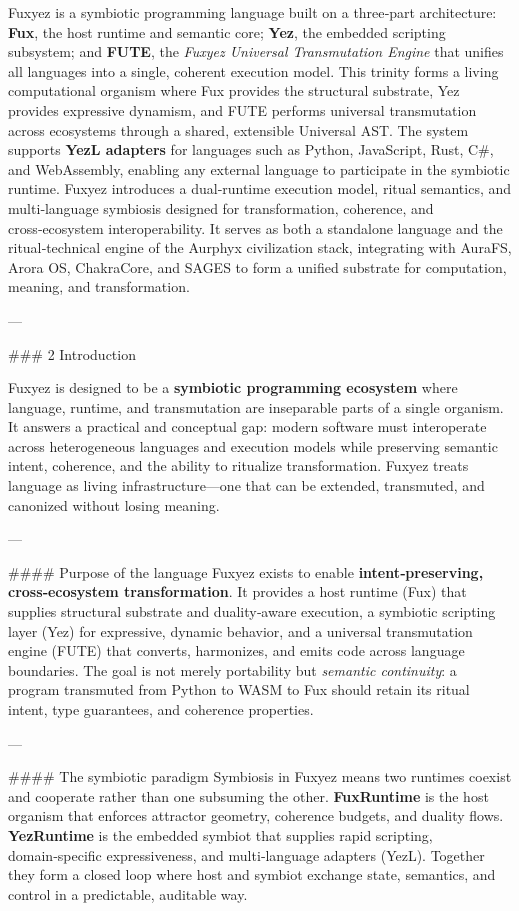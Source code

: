 \documentclass[12pt, a4paper]{book}
\begin{document}
Fuxyez is a symbiotic programming language built on a three‑part architecture: \textbf{Fux}, the host runtime and semantic core; \textbf{Yez}, the embedded scripting subsystem; and \textbf{FUTE}, the \textit{Fuxyez Universal Transmutation Engine} that unifies all languages into a single, coherent execution model. This trinity forms a living computational organism where Fux provides the structural substrate, Yez provides expressive dynamism, and FUTE performs universal transmutation across ecosystems through a shared, extensible Universal AST. The system supports \textbf{YezL adapters} for languages such as Python, JavaScript, Rust, C\#, and WebAssembly, enabling any external language to participate in the symbiotic runtime. Fuxyez introduces a dual‑runtime execution model, ritual semantics, and multi‑language symbiosis designed for transformation, coherence, and cross‑ecosystem interoperability. It serves as both a standalone language and the ritual‑technical engine of the Aurphyx civilization stack, integrating with AuraFS, Arora OS, ChakraCore, and SAGES to form a unified substrate for computation, meaning, and transformation.

---

\#\#\# 2 Introduction

Fuxyez is designed to be a \textbf{symbiotic programming ecosystem} where language, runtime, and transmutation are inseparable parts of a single organism. It answers a practical and conceptual gap: modern software must interoperate across heterogeneous languages and execution models while preserving semantic intent, coherence, and the ability to ritualize transformation. Fuxyez treats language as living infrastructure—one that can be extended, transmuted, and canonized without losing meaning.

---

\#\#\#\# Purpose of the language
Fuxyez exists to enable \textbf{intent‑preserving, cross‑ecosystem transformation}. It provides a host runtime (Fux) that supplies structural substrate and duality‑aware execution, a symbiotic scripting layer (Yez) for expressive, dynamic behavior, and a universal transmutation engine (FUTE) that converts, harmonizes, and emits code across language boundaries. The goal is not merely portability but \textit{semantic continuity}: a program transmuted from Python to WASM to Fux should retain its ritual intent, type guarantees, and coherence properties.

---

\#\#\#\# The symbiotic paradigm
Symbiosis in Fuxyez means two runtimes coexist and cooperate rather than one subsuming the other. \textbf{FuxRuntime} is the host organism that enforces attractor geometry, coherence budgets, and duality flows. \textbf{YezRuntime} is the embedded symbiot that supplies rapid scripting, domain‑specific expressiveness, and multi‑language adapters (YezL). Together they form a closed loop where host and symbiot exchange state, semantics, and control in a predictable, auditable way.
\end{document}
